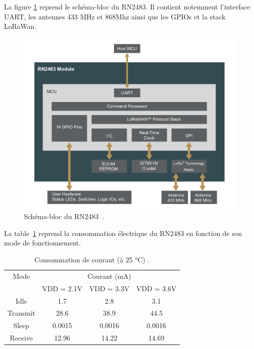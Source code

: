     La figure \ref{fig:state-rn2484-block} reprend le schéma-bloc du RN2483. Il contient notemment l'interface UART, les antennes 433 MHz et 868Mhz ainsi que les GPIOs et la stack LoRaWan.
    \begin{figure}[H]
        \centering
        \includegraphics[scale=0.4]{res/pictures/rn2483-block-diagram.png}
        \caption{Schéma-bloc du RN2483~\cite{rn2483:datasheet}.}
        \label{fig:state-rn2484-block}
    \end{figure}
    La table~\ref{tb:state-rn2483-consumption} reprend la consommation électrique du RN2483 en fonction de son mode de fonctionnement.
    \begin{table}[H]
        \centering
        \begin{tabular}{| *{4}{c|} }
            \hline
            Mode & \multicolumn{3}{c|}{\multirow{1}{*}{Courant (mA)}}\\ \cline{2-4}
             & VDD = 2.1V & VDD = 3.3V  & VDD = 3.6V \\ \hhline{|=|=|=|=|}
            Idle & 1.7 & 2.8 & 3.1 \\ \hline
            Transmit & 28.6 & 38.9 & 44.5 \\ \hline
            Sleep & 0.0015 & 0.0016 & 0.0016 \\ \hline
            Receive & 12.96 & 14.22 & 14.69 \\ \hline
        \end{tabular}
        \caption{Consommation de courant (à 25 °C) \cite{rn2483:datasheet}.}
        \label{tb:state-rn2483-consumption}
    \end{table}

